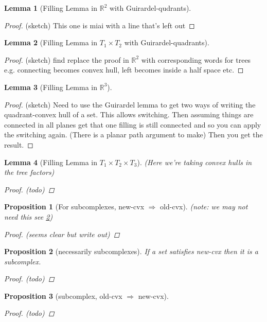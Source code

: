 \documentclass{article}
\theoremstyle{mystyle}
\newtheorem{lem}{Lemma}[section]
\newtheorem{pro}{Proposition}
\theoremstyle{remark}
\begin{document}
\begin{lem}
    [Filling Lemma in \(\mathbb{R}^{2}\) with Guirardel-qudrants]
\end{lem}
\begin{proof}
    (sketch) This one is miai with a line that's left out
\end{proof}
\begin{lem}
    [Filling Lemma in \(T_{1} \times T_{2}\) with Guirardel-quadrants]
\end{lem}
\begin{proof}
    (sketch) find replace the proof in \(\mathbb{R}^{2}\) with corresponding words for trees e.g. connecting becomes convex hull, left becomes inside a half space etc.
\end{proof}
\begin{lem}
    [Filling Lemma in \(\mathbb{R}^{3}\)]
\end{lem}
\begin{proof}
    (sketch) Need to use the Guirardel lemma to get two ways of writing the quadrant-convex hull of a set. This allows switching. Then assuming things are connected in all planes get that one filling is still connected and so you can apply the switching again. (There is a planar path argument to make) Then you get the result.
\end{proof}
\begin{lem}
    [Filling Lemma in \(T_{1} \times T_{2} \times T_{3}\)]
    (Here we're taking convex hulls in the tree factors)
\begin{proof}
    (todo)
\end{proof}
\end{lem}
\begin{pro}
    [For subcomplexes, new-cvx \(\Longrightarrow\) old-cvx]
    (note: we may not need this see \ref{label1})
    \begin{proof}
        (seems clear but write out)
    \end{proof}
\end{pro}
\begin{pro}
    [necessarily subcomplexes]
    \label{label1}
    If a set satisfies new-cvx then it is a subcomplex.
    \begin{proof}
        (todo)
    \end{proof}
\end{pro}
\begin{pro}
    [subcomplex, old-cvx \(\Longrightarrow\) new-cvx]
    \begin{proof}
        (todo)
    \end{proof}
\end{pro}
\end{document}
